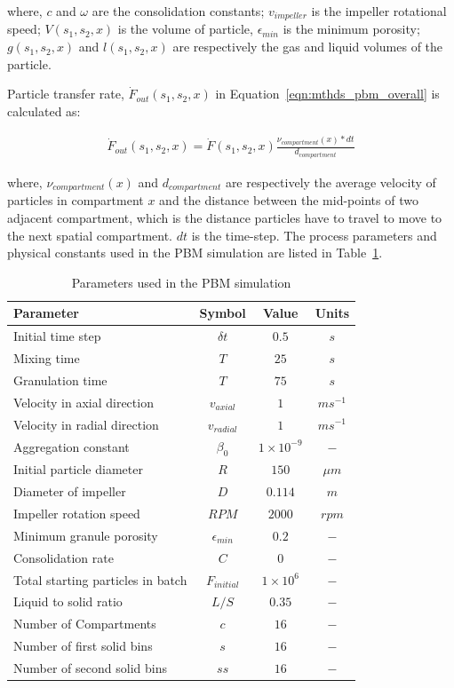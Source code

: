 \documentclass[preprint,11pt,authoryear]{elsarticle}
\begin{document}
 where, $c$ and $\omega$ are the consolidation constants; $v_{impeller}$ is the impeller 
rotational speed; $V(s_1,s_2,x)$ is the volume of particle, $\epsilon_{min}$ is the minimum porosity; 
$g(s_1,s_2,x)$ and $l(s_1,s_2,x)$ are respectively the gas and liquid volumes of the particle.

Particle transfer rate, $\dot{F}_{out}(s_1,s_2,x)$ in Equation~\ref{eqn:mthds_pbm_overall} is calculated 
as:

\begin{align}
\dot{F}_{out}(s_1,s_2,x) = \dot{F}(s_1,s_2,x)\frac{\nu_{compartment}(x)*dt}{d_{compartment}}
\end{align}

where, $\nu_{compartment}(x)$ and $d_{compartment}$ are respectively the average velocity of 
particles in compartment $x$ and the distance between the mid-points of two adjacent compartment, 
which is the distance particles have to travel to move to the next spatial compartment. $dt$ is the 
time-step.
The process parameters and physical constants used in the PBM simulation are listed in Table~\ref{table:mthds_pbm_parameters}.
\begin{table}
\caption{Parameters used in the PBM simulation}
\label{table:mthds_pbm_parameters}
\begin{center}
\begin{tabular}{l|c|c|c}
\hline
\bf{Parameter} &\bf{Symbol} &\bf{Value} &\bf{Units}\\
\hline
Initial time step & $\delta t$ & $0.5$ & $s$\\
Mixing time & $T$ & $25$ & $s$\\
Granulation time & $T$ & $75$ & $s$\\
Velocity in axial direction & $v_{axial}$ & $1$ & $ms^{-1}$\\
Velocity in radial direction & $v_{radial}$ & $1$ & $ms^{-1}$\\
Aggregation constant & $\beta_0$ & $1\times10^{-9}$ & $-$\\
Initial particle diameter & $R$ & $150$ & $\mu m$\\
Diameter of impeller & $D$ & $0.114$ & $m$ \\
Impeller rotation speed & $RPM$ & $2000$ & $rpm$\\
Minimum granule porosity & $\epsilon_{min}$ & $0.2$ & $-$\\
Consolidation rate & $C$ & $0$ & $-$\\
Total starting particles in batch & $F_{initial}$ & $1 \times 10^{6}$ & $-$\\
Liquid to solid ratio & $L/S$ & $0.35$ & $-$ \\
Number of Compartments & $c$ & $16$ & $-$ \\
Number of first solid bins & $s$ & $16$ & $-$\\
Number of second solid bins & $ss$ & $16$ & $-$\\
\hline
\end{tabular}
\end{center}
\end{table}
\end{document}
